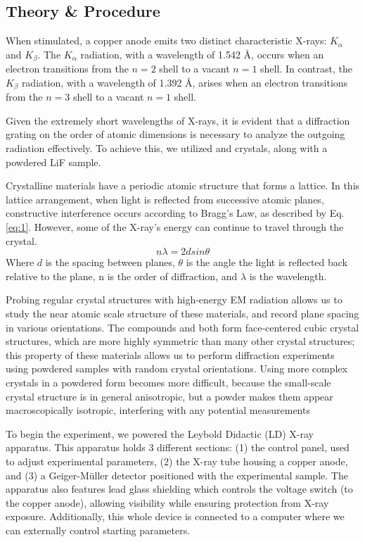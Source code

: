 \documentclass[a4paper,12pt,english]{all-in-one} %
\begin{document}
\begin{multicols}{2}

\section*{Theory \& Procedure}
{
When stimulated, a copper anode emits two distinct characteristic X-rays: $K_\alpha$ and $K_\beta$. The $K_\alpha$ radiation, with a wavelength of 1.542 Å, occurs when an electron transitions from the $n=2$ shell to a vacant $n=1$ shell. In contrast, the $K_\beta$ radiation, with a wavelength of 1.392 Å, arises when an electron transitions from the $n=3$ shell to a vacant $n=1$ shell.

Given the extremely short wavelengths of X-rays, it is evident that a diffraction grating on the order of atomic dimensions is necessary to analyze the outgoing radiation effectively. To achieve this, we utilized  and  crystals, along with a powdered LiF sample.

Crystalline materials have a periodic atomic structure that forms a lattice. In this lattice arrangement, when light is reflected from successive atomic planes, constructive interference occurs according to Bragg's Law, as described by Eq.\eqref{eq:1}. However, some of the X-ray's energy can continue to travel through the crystal.
\begin{equation}\label{eq:1}
    n\lambda = 2dsin\theta
\end{equation}
Where $d$ is the spacing between planes, $\theta$ is the angle the light is reflected back relative to the plane, n is the order of diffraction, and $\lambda$ is the wavelength.

Probing regular crystal structures with high-energy EM radiation allows us to study the near atomic scale structure of these materials, and record plane spacing in various orientations. The compounds  and  both form face-centered cubic crystal structures, which are more highly symmetric than many other crystal structures; this property of these materials allows us to perform diffraction experiments using powdered samples with random crystal orientations. Using more complex crystals in a powdered form becomes more difficult, because the small-scale crystal structure is in general anisotropic, but a powder makes them appear macroscopically isotropic, interfering with any potential measurements

To begin the experiment, we powered the Leybold Didactic (LD) X-ray apparatus. This apparatus holds 3 different sections: (1) the control panel, used to adjust experimental parameters, (2) the X-ray tube housing a copper anode, and (3) a Geiger-Müller detector positioned with the experimental sample. The apparatus also features lead glass shielding which controls the voltage switch (to the copper anode), allowing visibility while ensuring protection from X-ray exposure. Additionally, this whole device is connected to a computer where we can externally control starting parameters. 

}
\end{multicols}
\end{document}
